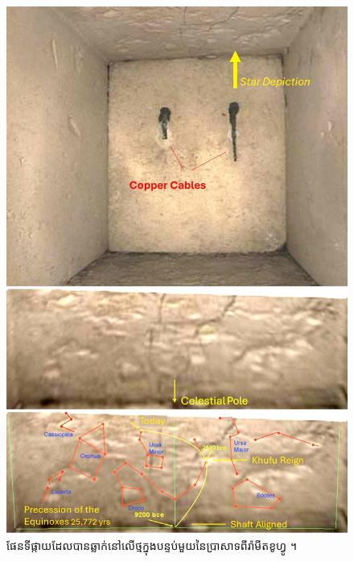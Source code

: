 \documentclass[10pt,twocolumn,letterpaper]{article}
\begin{document}
\begin{figure}[t]
\begin{center}
   \includegraphics[width=1\linewidth]{star-stone.jpg}
\end{center}
   \caption{ផែនទីផ្កាយដែលបានឆ្លាក់នៅលើថ្មក្នុងបន្ទប់មួយនៃប្រាសាទពីរ៉ាមីតខូហ្វូ \cite{28}។}
\label{fig:20}
\label{fig:onecol}
\end{figure}

\clearpage
\twocolumn
\end{document}
